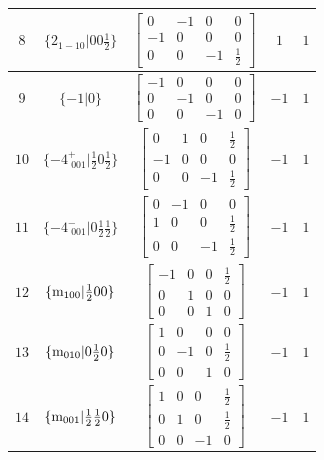 \documentclass[fleqn,8pt]{jsarticle}
\begin{document}
\begin{longtable}{ccccc}
$ 8 $ & $ \{2{}_{1-10}|0 0 \frac{1}{2}\} $ & $ \begin{bmatrix} 0 & -1 & 0 & 0 \\ -1 & 0 & 0 & 0 \\ 0 & 0 & -1 & \frac{1}{2} \end{bmatrix} $ & $ 1 $ & $ 1 $ \\ \hline
$ 9 $ & $ \{-1|0\} $ & $ \begin{bmatrix} -1 & 0 & 0 & 0 \\ 0 & -1 & 0 & 0 \\ 0 & 0 & -1 & 0 \end{bmatrix} $ & $ -1 $ & $ 1 $ \\ \hline
$ 10 $ & $ \{-4^{+}_{\,\,001}|\frac{1}{2} 0 \frac{1}{2}\} $ & $ \begin{bmatrix} 0 & 1 & 0 & \frac{1}{2} \\ -1 & 0 & 0 & 0 \\ 0 & 0 & -1 & \frac{1}{2} \end{bmatrix} $ & $ -1 $ & $ 1 $ \\ \hline
$ 11 $ & $ \{-4^{-}_{\,\,001}|0 \frac{1}{2} \frac{1}{2}\} $ & $ \begin{bmatrix} 0 & -1 & 0 & 0 \\ 1 & 0 & 0 & \frac{1}{2} \\ 0 & 0 & -1 & \frac{1}{2} \end{bmatrix} $ & $ -1 $ & $ 1 $ \\ \hline
$ 12 $ & $ \{{\rm m}_{100}|\frac{1}{2} 0 0\} $ & $ \begin{bmatrix} -1 & 0 & 0 & \frac{1}{2} \\ 0 & 1 & 0 & 0 \\ 0 & 0 & 1 & 0 \end{bmatrix} $ & $ -1 $ & $ 1 $ \\ \hline
$ 13 $ & $ \{{\rm m}_{010}|0 \frac{1}{2} 0\} $ & $ \begin{bmatrix} 1 & 0 & 0 & 0 \\ 0 & -1 & 0 & \frac{1}{2} \\ 0 & 0 & 1 & 0 \end{bmatrix} $ & $ -1 $ & $ 1 $ \\ \hline
$ 14 $ & $ \{{\rm m}_{001}|\frac{1}{2} \frac{1}{2} 0\} $ & $ \begin{bmatrix} 1 & 0 & 0 & \frac{1}{2} \\ 0 & 1 & 0 & \frac{1}{2} \\ 0 & 0 & -1 & 0 \end{bmatrix} $ & $ -1 $ & $ 1 $ \\ \hline

\end{longtable}
\end{document}
